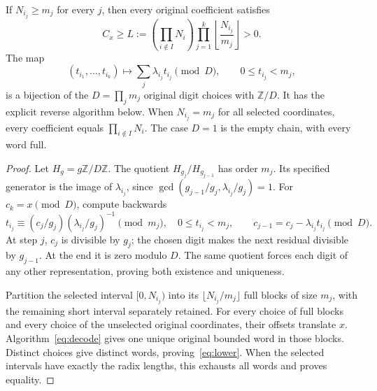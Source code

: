 \begin{theorem}\label{thm:chain}
If $N_{i_j}\ge m_j$ for every $j$, then every original coefficient satisfies
\begin{equation}\label{eq:lower}
 C_x\ge L:=(\prod_{i\notin I}N_i)
              \prod_{j=1}^k\left\lfloor\frac{N_{i_j}}{m_j}\right\rfloor>0.
\end{equation}
The map
\begin{equation}\label{eq:radix}
 (t_{i_1},\ldots,t_{i_k})\longmapsto
 \sum_j\lambda_{i_j}t_{i_j}\pmod D,
 \qquad0\le t_{i_j}<m_j,
\end{equation}
is a bijection of the $D=\prod_jm_j$ original digit choices with $\mathbb Z/D$.
It has the explicit reverse algorithm below. When $N_{i_j}=m_j$ for all
selected coordinates, every coefficient equals $\prod_{i\notin I}N_i$.
The case $D=1$ is the empty chain, with every word full.
\end{theorem}
\begin{proof}
Let $H_g=g\mathbb Z/D\mathbb Z$. The quotient
$H_{g_j}/H_{g_{j-1}}$ has order $m_j$. Its specified generator is the image
of $\lambda_{i_j}$, since
$\gcd(g_{j-1}/g_j,\lambda_{i_j}/g_j)=1$.
For $c_k=x\pmod D$, compute backwards
\begin{equation}\label{eq:decode}
 t_{i_j}\equiv(c_j/g_j)(\lambda_{i_j}/g_j)^{-1}\pmod{m_j},\quad
 0\le t_{i_j}<m_j,\qquad
 c_{j-1}=c_j-\lambda_{i_j}t_{i_j}\pmod D.
\end{equation}
At step $j$, $c_j$ is divisible by $g_j$; the chosen digit makes the next
residual divisible by $g_{j-1}$. At the end it is zero modulo $D$.
The same quotient forces each digit of any other representation, proving
both existence and uniqueness.

Partition the selected interval $[0,N_{i_j})$ into its
$\lfloor N_{i_j}/m_j\rfloor$ full blocks of size $m_j$, with the remaining
short interval separately retained. For every choice of full blocks and every
choice of the unselected original coordinates, their offsets translate $x$.
Algorithm~\eqref{eq:decode} gives one unique original bounded word in those
blocks. Distinct choices give distinct words, proving~\eqref{eq:lower}.
When the selected intervals have exactly the radix lengths, this exhausts
all words and proves equality.
\end{proof}

